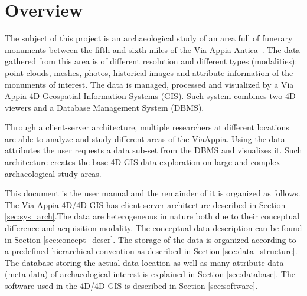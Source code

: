 \section{Overview}
\label{sec:dataman_overview}

The subject of this project is an archaeological study of an area full of
funerary monuments between the fifth and sixth miles of the Via Appia Antica~\cite{}.
The data gathered from this area is of different resolution and different
types (modalities): point clouds, meshes, photos, historical images and
attribute information of the monuments of interest. The data is managed,
processed and visualized by a Via Appia 4D Geospatial Information Systems (GIS).
Such system combines two 4D viewers and a Database Management System (DBMS).

Through a client-server architecture, multiple researchers at different locations
are able to analyze and study different areas of the ViaAppia. Using the data
attributes the user requests a data sub-set from the DBMS and visualizes it.
Such architecture creates the base 4D GIS data exploration on large and complex
archaeological study areas.

This document is the user manual and the remainder of it is organized as follows.
The Via Appia 4D/4D GIS has client-server architecture described in Section
\ref{sec:sys_arch}.The data are heterogeneous in nature both due to their
conceptual difference and acquisition modality. The conceptual data description
can be found in Section \ref{sec:concept_descr}. The storage of the data is
organized according to a predefined hierarchical convention as described in
Section \ref{sec:data_structure}. The database storing the actual data location as
well as many attribute data (meta-data) of archaeological interest is
explained in Section \ref{sec:database}. The software used in the 4D/4D GIS is
described in Section \ref{sec:software}.
